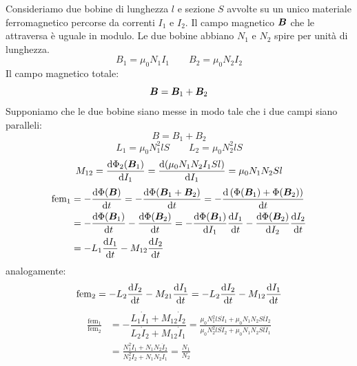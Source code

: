 \begin{Es}
  Consideriamo due bobine di lunghezza $l$ e sezione $S$ avvolte su un unico materiale ferromagnetico percorse da correnti $I_1$ e $I_2$. Il campo magnetico $\boldsymbol{B}$ che le attraversa è uguale in modulo. Le due bobine abbiano $N_1$ e $N_2$ spire per unità di lunghezza.
  \begin{equation}
    B_1=\mu_0N_1I_1\qquad B_2=\mu_0N_2I_2
  \end{equation}
  Il campo magnetico totale:
  \begin{equation}
    \boldsymbol{B}=\boldsymbol{B}_1+\boldsymbol{B}_2
  \end{equation}
  Supponiamo che le due bobine siano messe in modo tale che i due campi siano paralleli:
  \begin{equation}
    B=B_1+B_2
  \end{equation}
  \begin{equation}
    L_1=\mu_0N_1^2lS\qquad L_2=\mu_0N_2^2lS
  \end{equation}
  \begin{equation}
    M_{12}=\frac{\mathrm{d}\Phi_2(\boldsymbol{B}_1)}{\mathrm{d} I_1}=\frac{\mathrm{d}(\mu_0N_1N_2I_1Sl)}{\mathrm{d} I_1}=\mu_0N_1N_2Sl
  \end{equation}
  \begin{equation}
    \begin{split}
      \text{fem}_1&=-\frac{\mathrm{d}\Phi(\boldsymbol{B})}{\mathrm{d} t}=-\frac{\mathrm{d}\Phi(\boldsymbol{B}_1+\boldsymbol{B}_2)}{\mathrm{d} t}=-\frac{\mathrm{d}\left(\Phi(\boldsymbol{B}_1)+\Phi(\boldsymbol{B}_2)\right)}{\mathrm{d} t}\\
      &=-\frac{\mathrm{d}\Phi(\boldsymbol{B}_1)}{\mathrm{d} t}-\frac{\mathrm{d}\Phi(\boldsymbol{B}_2)}{\mathrm{d} t}=-\frac{\mathrm{d}\Phi(\boldsymbol{B}_1)}{\mathrm{d} I_1}\frac{\mathrm{d} I_1}{\mathrm{d} t}-\frac{\mathrm{d}\Phi(\boldsymbol{B}_2)}{\mathrm{d} I_2}\frac{\mathrm{d} I_2}{\mathrm{d} t}\\
      &=-L_1\frac{\mathrm{d} I_1}{\mathrm{d} t}-M_{12}\frac{\mathrm{d} I_2}{\mathrm{d} t}
    \end{split}
  \end{equation}
  analogamente:
  \begin{equation}
    \text{fem}_2=-L_2\frac{\mathrm{d} I_2}{\mathrm{d} t}-M_{21}\frac{\mathrm{d} I_1}{\mathrm{d} t}=-L_2\frac{\mathrm{d} I_2}{\mathrm{d} t}-M_{12}\frac{\mathrm{d} I_1}{\mathrm{d} t}
  \end{equation}
  \begin{align}
    \frac{\text{fem}_1}{\text{fem}_2} & =-\dfrac{L_1\dot I_1+M_{12}\dot I_2}{L_2 \dot I_2+M_{12}\dot I_1}=\frac{\mu_0N_1^2lS\dot I_1+\mu_0N_1N_2Sl\dot I_2}{\mu_0N_2^2lS \dot I_2+\mu_0N_1N_2Sl\dot I_1} \\
                                      & =\frac{N_1^2\dot I_1+N_1N_2\dot I_2}{N_2^2\dot I_2+N_1N_2\dot I_1}=\frac{N_1}{N_2}
  \end{align}
\end{Es}






